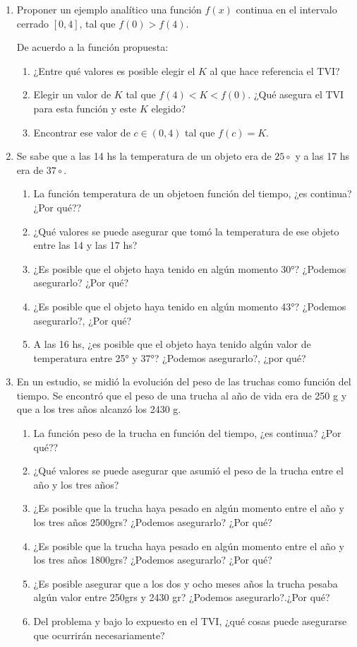 \documentclass[12pt]{article}
\theoremstyle{definition}
\begin{document}
\begin{enumerate}
\item Proponer un ejemplo analítico una función $f(x)$ continua en el intervalo cerrado $[0,4]$, tal que $f(0) > f(4)$. 

De acuerdo a la función propuesta:
 \begin{enumerate}
\item ¿Entre qué valores es posible elegir el $K$ al que hace referencia el TVI?
\item Elegir un valor de $K$ tal que $f(4) < K < f(0)$. ¿Qué asegura el TVI para esta función y este $K$ elegido?
\item Encontrar ese valor de $c \in (0,4)$ tal que $f(c) = K$.
\end{enumerate}

\item Se sabe que a las 14 hs la temperatura de un objeto era de $25\circ$ y a las 17 hs era de $37\circ$.
 \begin{enumerate}
\item La función temperatura de un objetoen función del tiempo, ¿es continua? ¿Por qué??
\item ¿Qué valores se puede asegurar que tomó la temperatura de ese objeto entre las 14 y las 17 hs?
\item ¿Es posible que el objeto haya tenido en algún momento 30°? ¿Podemos asegurarlo? ¿Por qué?
\item ¿Es posible que el objeto haya tenido en algún momento 43°? ¿Podemos asegurarlo?, ¿Por qué?
\item A las 16 hs, ¿es posible que el objeto haya tenido algún valor de temperatura entre 25° y 37°? ¿Podemos asegurarlo?, ¿por qué?
\end{enumerate}

\item  En un estudio, se midió la evolución del peso de las truchas como función del tiempo. Se encontró que el peso de una trucha al año de vida era de 250 g y que a los tres años alcanzó los 2430 g.
 \begin{enumerate}
\item La función peso de la trucha en función del tiempo, ¿es continua? ¿Por qué??
\item ¿Qué valores se puede asegurar que asumió el peso de la trucha entre el año y los tres años?
\item ¿Es posible que la trucha haya pesado en algún momento entre el año y los tres años 2500grs? ¿Podemos asegurarlo? ¿Por qué?
\item ¿Es posible que la trucha haya pesado en algún momento entre el año y los tres años 1800grs? ¿Podemos asegurarlo? ¿Por qué?
\item ¿Es posible asegurar que a los dos y ocho meses años la trucha pesaba algún valor entre 250grs y 2430 gr? ¿Podemos asegurarlo?.¿Por qué?
\item Del problema y bajo lo expuesto en el TVI, ¿qué cosas puede asegurarse que ocurrirán necesariamente? 
\end{enumerate}



\end{enumerate}
\end{document}
